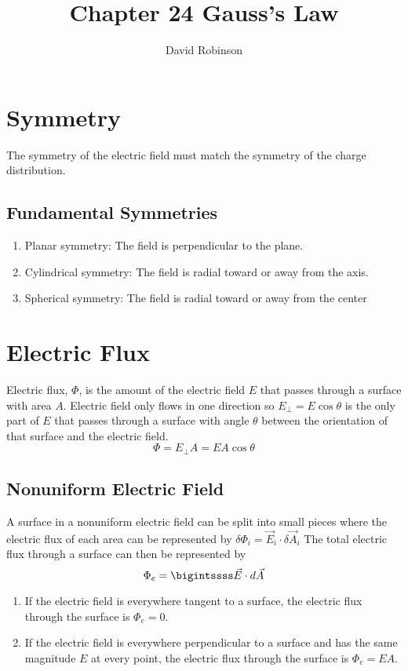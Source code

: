 \documentclass{article}
\title{Chapter 24 Gauss's Law}
\author{David Robinson}
\date{}
\begin{document}
\maketitle

\section*{Symmetry}
The symmetry of the electric field must match the symmetry of the charge distribution.

\subsection*{Fundamental Symmetries}
\begin{enumerate}
    \item Planar symmetry: The field is perpendicular to the plane.
    \item Cylindrical symmetry: The field is radial toward or away from the axis.
    \item Spherical symmetry: The field is radial toward or away from the center
\end{enumerate}

\section*{Electric Flux}
Electric flux, $\Phi$, is the amount of the electric field $E$ that passes through a surface with area $A$.
Electric field only flows in one direction so $E_\perp=E\cos\theta$ is the only part of $E$ that passes through a surface with angle $\theta$ between the orientation of that surface and the electric field.
\[\Phi = E_\perp A = EA\cos\theta\]

\subsection*{Nonuniform Electric Field}
A surface in a nonuniform electric field can be split into small pieces where the electric flux of each area can be represented by $\delta\Phi_i = \vec{E}_i\cdot\delta\vec{A}_i$
The total electric flux through a surface can then be represented by
\[\Phi_e =\bigintssss \vec{E}\cdot d\vec{A}\]

\begin{enumerate}
    \item If the electric field is everywhere tangent to a surface, the electric flux through the surface is $\Phi_e = 0$.
    \item If the electric field is everywhere perpendicular to a surface and has the same magnitude $E$ at every point, the electric flux through the surface is $\Phi_e = EA$.
\end{enumerate}
\end{document}
